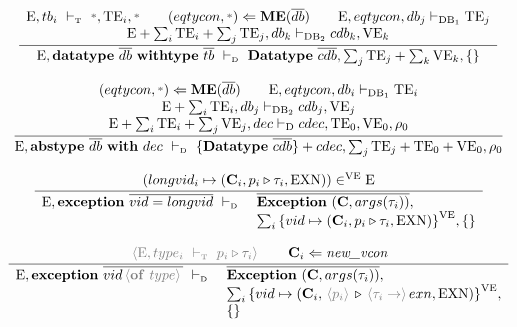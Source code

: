 \documentclass[11pt,a4paper]{article}
\newcommand{\key}[1]{\textrm{\textbf{#1}}}
\newcommand{\qualtype}[2]{#1 \triangleright #2}
\newcommand{\braced}[1]{\{#1\}}
\newcommand{\angled}[1]{\,{\color{gray}\langle#1\rangle}\,}
\newcommand{\wildcard}{{\color{gray}\scriptstyle\textbf{*}}}
\newcommand{\Env}  {\textrm{E}}
\newcommand{\VE}   {\textrm{VE}}
\newcommand{\TE}   {\textrm{TE}}
\newcommand{\Dec}  {\textrm{D}}
\newcommand{\DB}   {\textrm{DB}}
\newcommand{\VKE}  {\textrm{EXN}}
\newcommand{\vcon} {\mathbf{C}}
\newcommand{\Empty}{\braced{}}
\newcommand{\vdashD}  {\ \vdash_{\textrm{\tiny D}}\  }
\newcommand{\vdashT}  {\ \vdash_{\textrm{\tiny T}}\  }
\newcommand{\MaximizeEq}{\key{ME}}
\newcommand{\corenew}[1]{\textit{new\_#1}}
\newcommand{\vect}[1]{\overline{#1}}
\begin{document}
\[
\cfrac
 {\begin{array}{c}
  \Env,tb_{i} \vdashT \wildcard,\TE_i,\wildcard   		     \qquad 
  (eqtycon,\wildcard)\Leftarrow \MaximizeEq(\vect{db})   \qquad
  \Env,eqtycon,db_{j}\vdash_{\DB_1} \TE_j                    \\
  \Env+\sum_i{\TE_i}+\sum_j{\TE_j}, db_k \vdash_{\DB_2} cdb_k, \VE_k
  \end{array} }
 {\Env, \key{datatype}\ \vect{db}\ \key{withtype}\ \vect{tb} \vdashD 
 	\key{Datatype}\ \vect{cdb}, \sum_{j}\TE_j+\sum_{k}\VE_k , \Empty}
\]

\[
\cfrac
 {\begin{array}{c}
  (eqtycon,\wildcard)\Leftarrow \MaximizeEq(\vect{db})						 \qquad
   \Env,eqtycon,db_{i} \vdash_{\DB_1} \TE_i 									 \\ 
   \Env+\sum_i{\TE_i},db_j \vdash_{\DB_2} cdb_j,\VE_j       					 \\
  \Env+\sum_i{\TE_i}+\sum_j{\VE_j}, dec \vdash_{\Dec} cdec, \TE_0,\VE_0,\rho_0 \\
  \end{array}}
 {\Env, \key{abstype}\ \vect{db}\ \key{with}\ dec \vdashD \braced{\key{Datatype}\ \vect{cdb}}+cdec, \sum_{j}\TE_j+\TE_0+\VE_0, \rho_0}
\]

\[
\cfrac
 {(longvid_i \mapsto (\vcon_i, \qualtype{p_i}{\tau_i}, \VKE)) \in^\VE \Env }
 {\begin{array}{ll}
  \Env, \key{exception}\ \vect{vid = longvid} \vdashD & \vect{\key{Exception}\ (\vcon,args(\tau_i))}, \\
  & \sum_i{\braced{vid \mapsto (\vcon_i, \qualtype{p_i}{\tau_i}, \VKE)}}^\VE , \Empty \\
  \end{array}}
\]

\[
\cfrac
 {\angled{\Env,type_i \vdashT \qualtype{p_i}{\tau_i}} \qquad \vcon_i\Leftarrow\corenew{vcon}}
 {\begin{array}{ll}
  \Env, \key{exception}\ \vect{vid \angled{\key{of}\ type}} \vdashD & \vect{\key{Exception}\ (\vcon,args(\tau_i))}, \\
  & \sum_i{\braced{vid \mapsto (\vcon_i, \qualtype{\angled{p_i}}{\angled{\tau_i \to} exn, \VKE)}}}^\VE , \\
  & \Empty \\
  \end{array}}
\]
\end{document}
